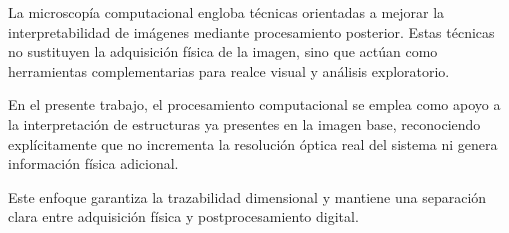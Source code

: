 La microscopía computacional engloba técnicas orientadas a mejorar la interpretabilidad de imágenes mediante procesamiento posterior. Estas técnicas no sustituyen la adquisición física de la imagen, sino que actúan como herramientas complementarias para realce visual y análisis exploratorio.

En el presente trabajo, el procesamiento computacional se emplea como apoyo a la interpretación de estructuras ya presentes en la imagen base, reconociendo explícitamente que no incrementa la resolución óptica real del sistema ni genera información física adicional.

Este enfoque garantiza la trazabilidad dimensional y mantiene una separación clara entre adquisición física y postprocesamiento digital.
